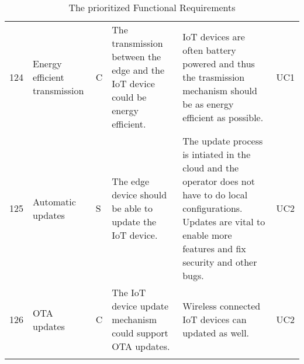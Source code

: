 \begin{longtable}{l p{2cm} p{0.8cm} p{3.6cm} p{4.5cm} p{0.8cm} }
124                     & Energy efficient transmission           & C     & The transmission between the edge and the IoT device could be energy efficient.                                                                                  & IoT devices are often battery powered and thus the trasmission mechanism should be as energy efficient as possible.                                                               & UC1    \\
125                     & Automatic updates                       & S     & The edge device should be able to update the IoT device.                                                                                                         & The update process is intiated in the cloud and the operator does not have to do local configurations. Updates are vital to enable more features and fix security and other bugs. & UC2    \\
126                     & OTA updates                             & C     & The IoT device update mechanism could support OTA updates.                                                                                                                & Wireless connected IoT devices can updated as well.                                                                                                                               & UC2   

\\

\caption{The prioritized Functional Requirements}
\end{longtable}
\label{tab:functionalRequirements}
\clearpage